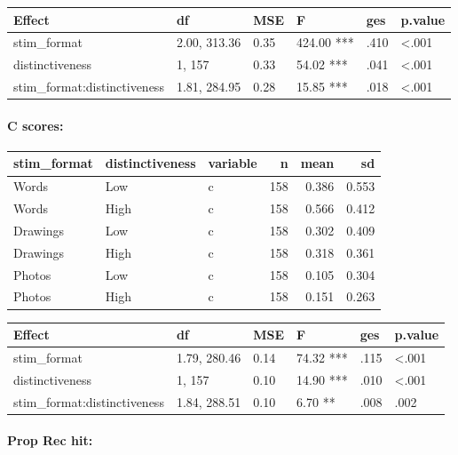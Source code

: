 \documentclass[
  11pt,
]{article}
\begin{document}
\begin{tabular}{l|l|l|l|l|l}
\hline
Effect & df & MSE & F & ges & p.value\\
\hline
stim\_format & 2.00, 313.36 & 0.35 & 424.00 *** & .410 & <.001\\
\hline
distinctiveness & 1, 157 & 0.33 & 54.02 *** & .041 & <.001\\
\hline
stim\_format:distinctiveness & 1.81, 284.95 & 0.28 & 15.85 *** & .018 & <.001\\
\hline
\end{tabular}

\newpage

\hypertarget{c-scores}{%
\paragraph{C scores:}\label{c-scores}}

\begin{table}[!h]
\centering
\begin{tabular}{lllrrr}
\toprule
stim\_format & distinctiveness & variable & n & mean & sd\\
\midrule
Words & Low & c & 158 & 0.386 & 0.553\\
Words & High & c & 158 & 0.566 & 0.412\\
Drawings & Low & c & 158 & 0.302 & 0.409\\
Drawings & High & c & 158 & 0.318 & 0.361\\
Photos & Low & c & 158 & 0.105 & 0.304\\
\addlinespace
Photos & High & c & 158 & 0.151 & 0.263\\
\bottomrule
\end{tabular}
\end{table}

\begin{tabular}{l|l|l|l|l|l}
\hline
Effect & df & MSE & F & ges & p.value\\
\hline
stim\_format & 1.79, 280.46 & 0.14 & 74.32 *** & .115 & <.001\\
\hline
distinctiveness & 1, 157 & 0.10 & 14.90 *** & .010 & <.001\\
\hline
stim\_format:distinctiveness & 1.84, 288.51 & 0.10 & 6.70 ** & .008 & .002\\
\hline
\end{tabular}

\newpage

\hypertarget{prop-rec-hit}{%
\paragraph{Prop Rec hit:}\label{prop-rec-hit}}
\end{document}
